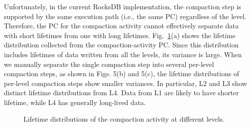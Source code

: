 Unfortunately, in the current RocksDB implementation, the compaction step is supported 
by the same execution path (i.e., the same PC) regardless of the level.
Therefore, the PC for the compaction activity cannot effectively separate data with 
short lifetimes from one with long lifetimes.
Fig.~\ref{fig:compaction}(a) shows 
the lifetime distribution collected from the compaction-activity PC.  
Since this distribution includes lifetimes of data written from all the levels, 
its variance is large.  
When we manually separate the single compaction step into several per-level compaction steps, 
as shown in Figs. 5(b) and 5(c), the lifetime distributions of per-level compaction steps 
show smaller variances.   
In particular, L2 and L3 show distinct lifetime distributions from L4.
Data from L1 are likely to have shorter lifetime, while L4 has generally
long-lived data.

\begin{figure}[!t]
\centering
\vspace{-7pt}
\hspace{2pt}
\hfill
\vspace{-10pt}
\vspace{-5pt}
\caption{Lifetime distributions of the compaction activity at different levels.} %
\label{fig:compaction}
\vspace{-15pt}
\end{figure}

